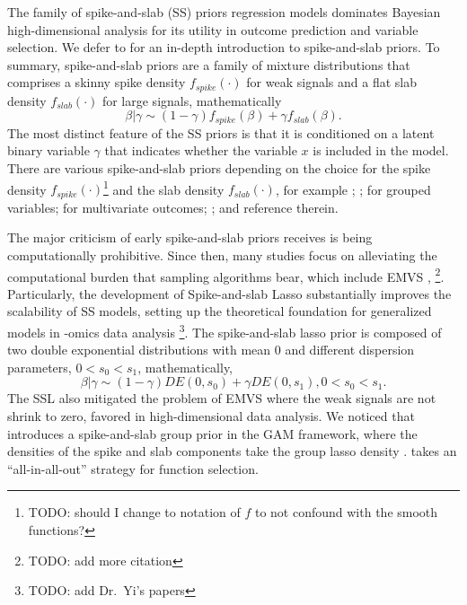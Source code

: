 \documentclass[AMA,STIX1COL,]{WileyNJD-v2}
\begin{document}
The family of spike-and-slab (SS) priors regression models dominates
Bayesian high-dimensional analysis for its utility in outcome prediction
and variable selection. We defer to \citet{Bai2021Review} for an
in-depth introduction to spike-and-slab priors. To summary,
spike-and-slab priors are a family of mixture distributions that
comprises a skinny spike density \(f_{spike}(\cdot)\) for weak signals
and a flat slab density \(f_{slab}(\cdot)\) for large signals,
mathematically \[
 \beta|\gamma \sim (1-\gamma)f_{spike}(\beta) + \gamma f_{slab}(\beta).
\] The most distinct feature of the SS priors is that it is conditioned
on a latent binary variable \(\gamma\) that indicates whether the
variable \(x\) is included in the model. There are various
spike-and-slab priors depending on the choice for the spike density
\(f_{spike}(\cdot)\)\footnote{TODO: should I change to notation of \(f\)
  to not confound with the smooth functions?} and the slab density
\(f_{slab}(\cdot)\), for example \citet{George1993}; \citet{George1997};
\citet{Chipman1996} for grouped variables; \citet{Brown1998} for
multivariate outcomes; \citet{Ishwaran2005}; \citet{Clyde2004} and
reference therein.

The major criticism of early spike-and-slab priors receives is being
computationally prohibitive. \citep{Bai2021Review} Since then, many
studies focus on alleviating the computational burden that sampling
algorithms bear, which include EMVS \citep{Rockova2014a}, \footnote{TODO:
  add more citation}. Particularly, the development of Spike-and-slab
Lasso \citep{Rockova2018b, Rockova2018} substantially improves the
scalability of SS models, setting up the theoretical foundation for
generalized models in -omics data analysis \footnote{TODO: add Dr.~Yi's
  papers}. The spike-and-slab lasso prior is composed of two double
exponential distributions with mean 0 and different dispersion
parameters, \(0 < s_0 < s_1\), mathematically,
\begin{equation} \label{eq:ssl}
\beta | \gamma \sim (1-\gamma)DE(0, s_0) + \gamma DE(0, s_1), 0 < s_0 < s_1.
\end{equation} The SSL also mitigated the problem of EMVS where the weak
signals are not shrink to zero, favored in high-dimensional data
analysis. We noticed that \citet{Bai2021} introduces a spike-and-slab
group prior in the GAM framework, where the densities of the spike and
slab components take the group lasso density \citep{Xu2015}.
\citet{Bai2021} takes an ``all-in-all-out'' strategy for function
selection.
\end{document}
